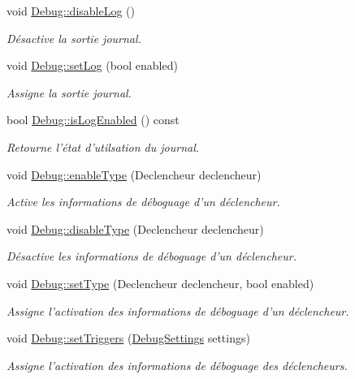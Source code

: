 \begin{DoxyCompactItemize}
void \hyperlink{group__inf2990_ga05742456a67e8e3104a3a6d0134c58ed}{Debug\-::disable\-Log} ()
\begin{DoxyCompactList}\small\item\em Désactive la sortie journal. \end{DoxyCompactList}\item 
void \hyperlink{group__inf2990_gafa37fad6a0a050a913eb0e482f1b0282}{Debug\-::set\-Log} (bool enabled)
\begin{DoxyCompactList}\small\item\em Assigne la sortie journal. \end{DoxyCompactList}\item 
bool \hyperlink{group__inf2990_gae22799c006444ad7f48e7de490b41ef0}{Debug\-::is\-Log\-Enabled} () const 
\begin{DoxyCompactList}\small\item\em Retourne l'état d'utilsation du journal. \end{DoxyCompactList}\item 
void \hyperlink{group__inf2990_ga55375c6c14be967ed7f25eed578a6265}{Debug\-::enable\-Type} (Declencheur declencheur)
\begin{DoxyCompactList}\small\item\em Active les informations de déboguage d'un déclencheur. \end{DoxyCompactList}\item 
void \hyperlink{group__inf2990_gaefa863abf2c2b3c6c741b88b3f78e8b3}{Debug\-::disable\-Type} (Declencheur declencheur)
\begin{DoxyCompactList}\small\item\em Désactive les informations de déboguage d'un déclencheur. \end{DoxyCompactList}\item 
void \hyperlink{group__inf2990_gaf6b5623dc8f2fdc90abb3648499f3415}{Debug\-::set\-Type} (Declencheur declencheur, bool enabled)
\begin{DoxyCompactList}\small\item\em Assigne l'activation des informations de déboguage d'un déclencheur. \end{DoxyCompactList}\item 
void \hyperlink{group__inf2990_gaba1a061318eb0f1819f0c02754b3cb62}{Debug\-::set\-Triggers} (\hyperlink{struct_debug_settings}{Debug\-Settings} settings)
\begin{DoxyCompactList}\small\item\em Assigne l'activation des informations de déboguage des déclencheurs. \end{DoxyCompactList}\item 

\end{DoxyCompactItemize}
